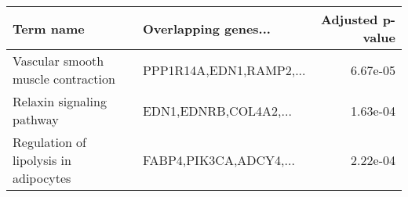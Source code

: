 \begin{tabular}{llr}
\toprule
                            Term name &    Overlapping genes... &  Adjusted p-value \\
\midrule
   Vascular smooth muscle contraction & PPP1R14A,EDN1,RAMP2,... &          6.67e-05 \\
            Relaxin signaling pathway &   EDN1,EDNRB,COL4A2,... &          1.63e-04 \\
Regulation of lipolysis in adipocytes &  FABP4,PIK3CA,ADCY4,... &          2.22e-04 \\
\bottomrule
\end{tabular}
